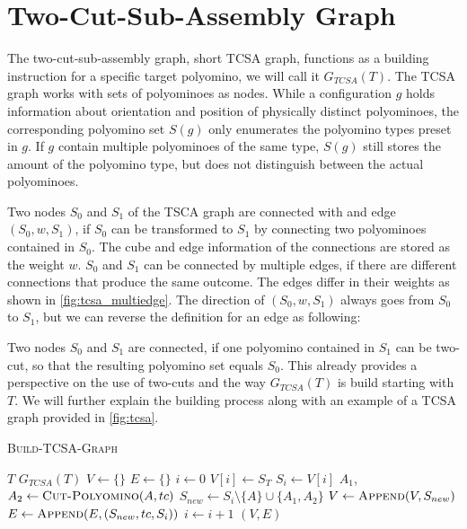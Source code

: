 \section{Two-Cut-Sub-Assembly Graph}
\label{sec:tcsa}

The two-cut-sub-assembly graph, short TCSA graph, functions as a building instruction for a specific target polyomino, we will call it $G_{TCSA}(T)$.
The TCSA graph works with sets of polyominoes as nodes.
While a configuration $g$ holds information about orientation and position of physically distinct polyominoes, the corresponding polyomino set $S(g)$ only enumerates the polyomino types preset in $g$.
If $g$ contain multiple polyominoes of the same type, $S(g)$ still stores the amount of the polyomino type, but does not distinguish between the actual polyominoes.

Two nodes $S_0$ and $S_1$ of the TSCA graph are connected with and edge $(S_0,w,S_1)$, if $S_0$ can be transformed to $S_1$ by connecting two polyominoes contained in $S_0$.
The cube and edge information of the connections are stored as the weight $w$.
$S_0$ and $S_1$ can be connected by multiple edges, if there are different connections that produce the same outcome.
The edges differ in their weights as shown in \autoref{fig:tcsa_multiedge}.
The direction of $(S_0,w,S_1)$ always goes from $S_0$ to $S_1$, but we can reverse the definition for an edge as following:

Two nodes $S_0$ and $S_1$ are connected, if one polyomino contained in $S_1$ can be two-cut, so that the resulting polyomino set equals $S_0$.
This already provides a perspective on the use of two-cuts and the way $G_{TCSA}(T)$ is build starting with $T$.
We will further explain the building process along with an example of a TCSA graph provided in \autoref{fig:tcsa}.


\begin{algorithm}
	\caption{\scshape Build-TCSA-Graph}
	\label{algo:build_tcsa}
	\begin{algorithmic}[1]
		\REQUIRE $T$
		\ENSURE $G_{TCSA}(T)$  
		\STATE $V \gets \{\}$
		\STATE $E \gets \{\}$
		\STATE $i \gets 0$
		\STATE $V[i] \gets S_T$
			\STATE $S_i \gets V[i]$
					\STATE $A_1$,$A_2 \gets \text{\scshape Cut-Polyomino}(A, tc)$
					\STATE $S_{new} \gets S_i \setminus \{A\} \cup \{A_1, A_2\}$
						\STATE $V \gets \text{\scshape Append}(V, S_{new})$
					\ENDIF
					\STATE $E \gets \text{\scshape Append}(E, (S_{new}, tc, S_i))$
				\ENDFOR
			\ENDFOR
			\STATE $i \gets i+1$
		\ENDWHILE
		\RETURN $(V,E)$
	\end{algorithmic}
\end{algorithm}


